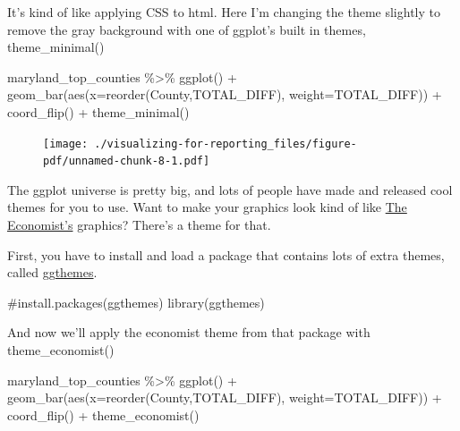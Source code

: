 \documentclass[
  letterpaper,
  DIV=11,
  numbers=noendperiod]{scrreprt}
\newenvironment{Shaded}{\begin{snugshade}}{\end{snugshade}}
\newcommand{\AttributeTok}[1]{\textcolor[rgb]{0.40,0.45,0.13}{#1}}
\newcommand{\CommentTok}[1]{\textcolor[rgb]{0.37,0.37,0.37}{#1}}
\newcommand{\FunctionTok}[1]{\textcolor[rgb]{0.28,0.35,0.67}{#1}}
\newcommand{\NormalTok}[1]{\textcolor[rgb]{0.00,0.23,0.31}{#1}}
\newcommand{\SpecialCharTok}[1]{\textcolor[rgb]{0.37,0.37,0.37}{#1}}
\begin{document}
It's kind of like applying CSS to html. Here I'm changing the theme
slightly to remove the gray background with one of ggplot's built in
themes, theme\_minimal()

\begin{Shaded}
\begin{Highlighting}[]
\NormalTok{maryland\_top\_counties }\SpecialCharTok{\%\textgreater{}\%}
  \FunctionTok{ggplot}\NormalTok{() }\SpecialCharTok{+}
  \FunctionTok{geom\_bar}\NormalTok{(}\FunctionTok{aes}\NormalTok{(}\AttributeTok{x=}\FunctionTok{reorder}\NormalTok{(County,TOTAL\_DIFF), }\AttributeTok{weight=}\NormalTok{TOTAL\_DIFF)) }\SpecialCharTok{+}
  \FunctionTok{coord\_flip}\NormalTok{() }\SpecialCharTok{+} 
  \FunctionTok{theme\_minimal}\NormalTok{()}
\end{Highlighting}
\end{Shaded}

\begin{figure}[H]

{\centering \texttt{[image: ./visualizing-for-reporting\_files/figure-pdf/unnamed-chunk-8-1.pdf]}

}

\end{figure}

The ggplot universe is pretty big, and lots of people have made and
released cool themes for you to use. Want to make your graphics look
kind of like \href{https://www.economist.com/}{The Economist's}
graphics? There's a theme for that.

First, you have to install and load a package that contains lots of
extra themes, called
\href{https://yutannihilation.github.io/allYourFigureAreBelongToUs/ggthemes/}{ggthemes}.

\begin{Shaded}
\begin{Highlighting}[]
\CommentTok{\#install.packages(\textquotesingle{}ggthemes\textquotesingle{})}
\FunctionTok{library}\NormalTok{(ggthemes)}
\end{Highlighting}
\end{Shaded}

And now we'll apply the economist theme from that package with
theme\_economist()

\begin{Shaded}
\begin{Highlighting}[]
\NormalTok{maryland\_top\_counties }\SpecialCharTok{\%\textgreater{}\%}
  \FunctionTok{ggplot}\NormalTok{() }\SpecialCharTok{+}
  \FunctionTok{geom\_bar}\NormalTok{(}\FunctionTok{aes}\NormalTok{(}\AttributeTok{x=}\FunctionTok{reorder}\NormalTok{(County,TOTAL\_DIFF), }\AttributeTok{weight=}\NormalTok{TOTAL\_DIFF)) }\SpecialCharTok{+}
  \FunctionTok{coord\_flip}\NormalTok{() }\SpecialCharTok{+} 
  \FunctionTok{theme\_economist}\NormalTok{()}
\end{Highlighting}
\end{Shaded}
\end{document}
